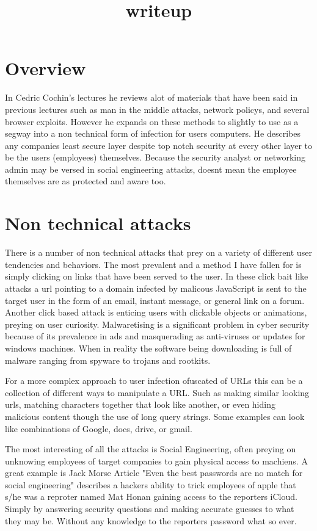 \documentclass[letterpaper,12pt,titlepage,onecolumn]{IEEEtran}
\author{\name}
\title{writeup}
\begin{document}
\maketitle
\hrulefill


\section{Overview}
In Cedric Cochin's lectures he reviews alot of materials that have been said in previous lectures such as man in the middle attacks, network policys, and several browser exploits. However he expands on these methods to slightly to use as a segway into a non technical form of infection for users computers. He describes any companies least secure layer despite top notch security at every other layer to be the users (employees) themselves. Because the security analyst or networking admin may be versed in social engineering attacks, doesnt mean the employee themselves are as protected and aware too.

\section{Non technical attacks}
There is a number of non technical attacks that prey on a variety of different user tendencies and behaviors. The most prevalent and a method I have fallen for is simply clicking on links that have been served to the user. In these click bait like attacks a url pointing to a domain infected by malicous JavaScript is sent to the target user in the form of an email, instant message, or general link on a forum. Another click based attack is enticing users with clickable objects or animations, preying on user curiosity. Malwaretising is a significant problem in cyber security because of its prevalence in ads and masquerading as anti-viruses or updates for windows machines. When in reality the software being downloading is full of malware ranging from spyware to trojans and rootkits.\par
For a more complex approach to user infection ofuscated of URLs this can be a collection of different ways to manipulate a URL. Such as making similar looking urls, matching characters together that look like another, or even hiding malicious content though the use of long query strings.  Some examples can look like combinations of Google, docs, drive, or gmail.\par
The most interesting of all the attacks is Social Engineering, often preying on unknowing employees of target companies to gain physical access to machiens. A great example is Jack Morse Article "Even the best passwords are no match for social engineering" describes a hackers ability to trick employees of apple that s/he was a reproter named Mat Honan gaining access to the reporters iCloud. Simply by answering security questions and making accurate guesses to what they may be. Without any knowledge to the reporters password what so ever.
\end{document}
